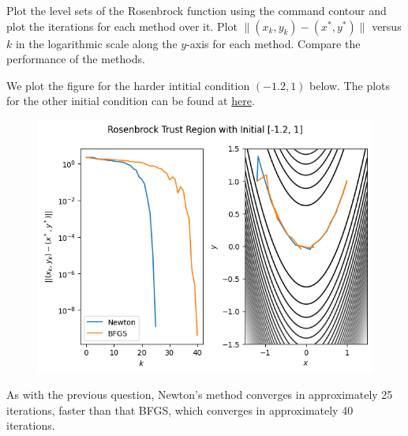 \documentclass{../kin_math}
\begin{document}
\begin{questions}
  Plot the level sets of the Rosenbrock function using the command contour and plot the iterations for each method over it. Plot $\lVert (x_k, y_k) - (x^*, y^*) \rVert$ versus $k$ in the logarithmic scale along the $y$-axis for each method. Compare the performance of the methods.
  \begin{solution}
    We plot the figure for the harder intitial condition $(-1.2, 1)$ below. The plots for the other initial condition can be found at \href{https://github.com/elijahkin/amsc660/blob/main/hw11/hw11.ipynb}{here}.
    \begin{figure}
      \centering
      \includegraphics[scale=0.6]{rosenbrock.png}
    \end{figure}
    As with the previous question, Newton's method converges in approximately 25 iterations, faster than that BFGS, which converges in approximately 40 iterations.
  \end{solution}
\end{questions}
\end{document}
